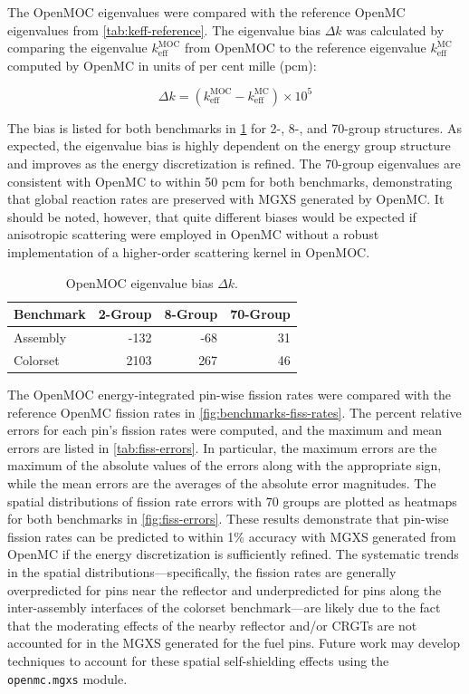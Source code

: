 The OpenMOC eigenvalues were compared with the reference OpenMC eigenvalues from \cref{tab:keff-reference}. The eigenvalue bias $\Delta k$ was calculated by comparing the eigenvalue $k_{\textrm{eff}}^{\textrm{MOC}}$ from OpenMOC to the reference eigenvalue $k_{\textrm{eff}}^{\textrm{MC}}$ computed by OpenMC in units of per cent mille (pcm):

\begin{equation}
\label{eqn:delta-rho}
\Delta k = \left(k_{\textrm{eff}}^{\textrm{MOC}} - k_{\textrm{eff}}^{\textrm{MC}}\right) \times 10^{5}
\end{equation}

The bias is listed for both benchmarks in \cref{tab:keff-bias} for 2-, 8-, and 70-group structures. As expected, the eigenvalue bias is highly dependent on the energy group structure and improves as the energy discretization is refined. The 70-group eigenvalues are consistent with OpenMC to within 50 pcm for both benchmarks, demonstrating that global reaction rates are preserved with MGXS generated by OpenMC. It should be noted, however, that quite different biases would be expected if anisotropic scattering were employed in OpenMC without a robust implementation of a higher-order scattering kernel in OpenMOC.

\begin{table}[h!]
  \centering
  \caption{OpenMOC eigenvalue bias $\Delta k$.}
  \label{tab:keff-bias}
  \begin{tabular}{l r r r}
  \toprule
  \textbf{Benchmark} & \textbf{2-Group} & \textbf{8-Group} & \textbf{70-Group} \\
  \midrule
  Assembly & -132 & -68 & 31 \\
  \midrule
  Colorset & 2103 & 267 & 46 \\
  \bottomrule
\end{tabular}
\end{table}

The OpenMOC energy-integrated pin-wise fission rates were compared with the reference OpenMC fission rates in \cref{fig:benchmarks-fiss-rates}. The percent relative errors for each pin's fission rates were computed, and the maximum and mean errors are listed in \cref{tab:fiss-errors}. In particular, the maximum errors are the maximum of the absolute values of the errors along with the appropriate sign, while the mean errors are the averages of the absolute error magnitudes. The spatial distributions of fission rate errors with 70 groups are plotted as heatmaps for both benchmarks in \cref{fig:fiss-errors}. These results demonstrate that pin-wise fission rates can be predicted to within 1\% accuracy with MGXS generated from OpenMC if the energy discretization is sufficiently refined. The systematic trends in the spatial distributions---specifically, the fission rates are generally overpredicted for pins near the reflector and underpredicted for pins along the inter-assembly interfaces of the colorset benchmark---are likely due to the fact that the moderating effects of the nearby reflector and/or CRGTs are not accounted for in the MGXS generated for the fuel pins. Future work may develop techniques to account for these spatial self-shielding effects using the \texttt{openmc.mgxs} module.


